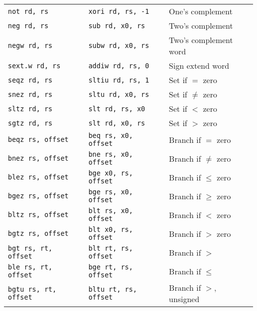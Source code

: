 \begin{tabular}{l l l}
{\tt not rd, rs} & {\tt xori rd, rs, -1} & One's complement \\
{\tt neg rd, rs} & {\tt sub rd, x0, rs} & Two's complement \\
{\tt negw rd, rs} & {\tt subw rd, x0, rs} & Two's complement word \\
{\tt sext.w rd, rs} & {\tt addiw rd, rs, 0} & Sign extend word \\
{\tt seqz rd, rs} & {\tt sltiu rd, rs, 1} & Set if $=$ zero \\
{\tt snez rd, rs} & {\tt sltu rd, x0, rs} & Set if $\neq$ zero \\
{\tt sltz rd, rs} & {\tt slt rd, rs, x0} & Set if $<$ zero \\
{\tt sgtz rd, rs} & {\tt slt rd, x0, rs} & Set if $>$ zero \\
\hline
{\tt beqz rs, offset} & {\tt beq rs, x0, offset} & Branch if $=$ zero \\
{\tt bnez rs, offset} & {\tt bne rs, x0, offset} & Branch if $\neq$ zero \\
{\tt blez rs, offset} & {\tt bge x0, rs, offset} & Branch if $\leq$ zero \\
{\tt bgez rs, offset} & {\tt bge rs, x0, offset} & Branch if $\geq$ zero \\
{\tt bltz rs, offset} & {\tt blt rs, x0, offset} & Branch if $<$ zero \\
{\tt bgtz rs, offset} & {\tt blt x0, rs, offset} & Branch if $>$ zero \\
\hline
{\tt bgt rs, rt, offset} & {\tt blt rt, rs, offset} & Branch if $>$ \\
{\tt ble rs, rt, offset} & {\tt bge rt, rs, offset} & Branch if $\leq$ \\
{\tt bgtu rs, rt, offset} & {\tt bltu rt, rs, offset} & Branch if $>$, unsigned \\

\end{tabular}
